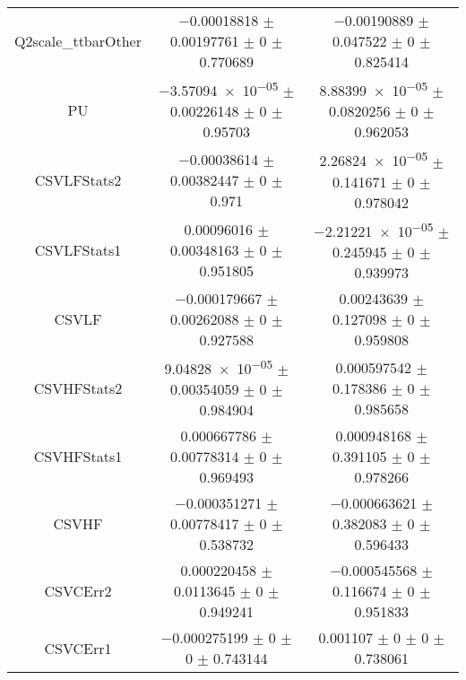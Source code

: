 \begin{table}
\begin{tabular}{ccc}
Q2scale\_ttbarOther & \num{-0.00018818} $\pm$ \num{0.00197761} $\pm$ \num{0} $\pm$ \num{0.770689} & \num{-0.00190889} $\pm$ \num{0.047522} $\pm$ \num{0} $\pm$ \num{0.825414}\\
PU & \num{-3.57094e-05} $\pm$ \num{0.00226148} $\pm$ \num{0} $\pm$ \num{0.95703} & \num{8.88399e-05} $\pm$ \num{0.0820256} $\pm$ \num{0} $\pm$ \num{0.962053}\\
CSVLFStats2 & \num{-0.00038614} $\pm$ \num{0.00382447} $\pm$ \num{0} $\pm$ \num{0.971} & \num{2.26824e-05} $\pm$ \num{0.141671} $\pm$ \num{0} $\pm$ \num{0.978042}\\
CSVLFStats1 & \num{0.00096016} $\pm$ \num{0.00348163} $\pm$ \num{0} $\pm$ \num{0.951805} & \num{-2.21221e-05} $\pm$ \num{0.245945} $\pm$ \num{0} $\pm$ \num{0.939973}\\
CSVLF & \num{-0.000179667} $\pm$ \num{0.00262088} $\pm$ \num{0} $\pm$ \num{0.927588} & \num{0.00243639} $\pm$ \num{0.127098} $\pm$ \num{0} $\pm$ \num{0.959808}\\
CSVHFStats2 & \num{9.04828e-05} $\pm$ \num{0.00354059} $\pm$ \num{0} $\pm$ \num{0.984904} & \num{0.000597542} $\pm$ \num{0.178386} $\pm$ \num{0} $\pm$ \num{0.985658}\\
CSVHFStats1 & \num{0.000667786} $\pm$ \num{0.00778314} $\pm$ \num{0} $\pm$ \num{0.969493} & \num{0.000948168} $\pm$ \num{0.391105} $\pm$ \num{0} $\pm$ \num{0.978266}\\
CSVHF & \num{-0.000351271} $\pm$ \num{0.00778417} $\pm$ \num{0} $\pm$ \num{0.538732} & \num{-0.000663621} $\pm$ \num{0.382083} $\pm$ \num{0} $\pm$ \num{0.596433}\\
CSVCErr2 & \num{0.000220458} $\pm$ \num{0.0113645} $\pm$ \num{0} $\pm$ \num{0.949241} & \num{-0.000545568} $\pm$ \num{0.116674} $\pm$ \num{0} $\pm$ \num{0.951833}\\
CSVCErr1 & \num{-0.000275199} $\pm$ \num{0} $\pm$ \num{0} $\pm$ \num{0.743144} & \num{0.001107} $\pm$ \num{0} $\pm$ \num{0} $\pm$ \num{0.738061}\\
\bottomrule
\end{tabular}
\end{table}